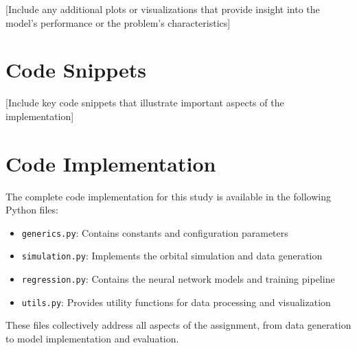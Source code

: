 \documentclass[12pt,a4paper]{article}
\begin{document}
[Include any additional plots or visualizations that provide insight into the model's performance or the problem's characteristics]

\section{Code Snippets}
\label{appendix:code_snippets}

[Include key code snippets that illustrate important aspects of the implementation]
\section{Code Implementation}
\label{sec:appendix}
The complete code implementation for this study is available in the following Python files:

\begin{itemize}
    \item \texttt{generics.py}: Contains constants and configuration parameters
    \item \texttt{simulation.py}: Implements the orbital simulation and data generation
    \item \texttt{regression.py}: Contains the neural network models and training pipeline
    \item \texttt{utils.py}: Provides utility functions for data processing and visualization
\end{itemize}

These files collectively address all aspects of the assignment, from data generation to model implementation and evaluation.
\end{document}

